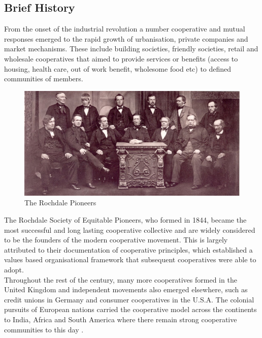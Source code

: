 \subsection{Brief History}
From the onset of  the industrial revolution a number cooperative and mutual responses emerged to the rapid growth of urbanisation, private companies and market mechanisms.  These include building societies, friendly societies, retail and wholesale cooperatives that aimed to provide services or benefits (access to housing, health care, out of work benefit, wholesome food etc) to defined communities of members.\\

\begin{figure}
\centering
\includegraphics[width=\textwidth]{Figures/rochdale_pioneers}
\decoRule
\caption[Rochdale Pioneers]{The Rochdale Pioneers}
\label{fig:pioneers}
\end{figure}

The Rochdale Society of Equitable Pioneers, who formed in 1844\cite{Pioneers}, became the most successful and long lasting cooperative collective and are widely considered to be the founders of the modern cooperative movement. This is largely attributed to their documentation of cooperative principles\cite{Principles}, which established a values based organisational framework that subsequent cooperatives were able to adopt.\\

Throughout the rest of the century, many more cooperatives formed in the United Kingdom and independent movements also emerged elsewhere, such as credit unions in Germany and consumer cooperatives in the U.S.A. The colonial pursuits of European nations carried the cooperative model across the continents to India, Africa and South America where there remain strong cooperative communities to this day \cite{Coops_india_wiki}\cite{Coops_india}\cite{Kenya_coops}.\\   

